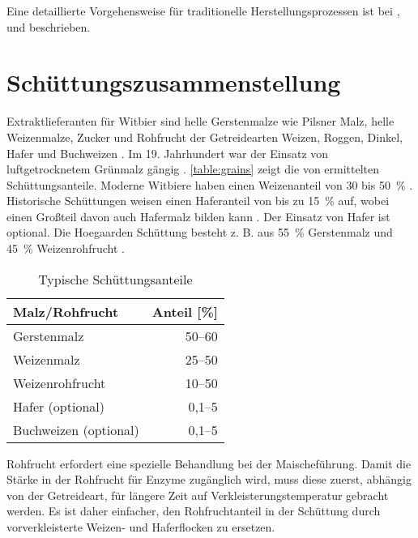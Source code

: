 \documentclass[a4paper,parskip=half]{scrartcl}
\begin{document}
Eine detaillierte Vorgehensweise für traditionelle Herstellungsprozessen
ist bei \citeauthor{Hieronymus2010}, \citeauthor{Mulder2020} und
\citeauthor{Strottner1999} beschrieben.

\section*{Schüttungszusammenstellung}

Extraktlieferanten für Witbier sind helle Gerstenmalze wie Pilsner Malz,
helle Weizenmalze, Zucker und Rohfrucht der Getreidearten Weizen, Roggen,
Dinkel, Hafer und Buchweizen \parencite[14]{Strottner1999}. Im 19.
Jahrhundert war der Einsatz von luftgetrocknetem Grünmalz gängig
\parencite[38]{Hieronymus2010}. \autoref{table:grains} zeigt die von \citeauthor{Strottner1999}
ermittelten Schüttungsanteile. Moderne Witbiere haben einen Weizenanteil
von 30 bis 50~\% \parencite[45]{Mulder2020}. Historische
Schüttungen weisen einen Haferanteil von bis zu 15~\% auf, wobei
einen Großteil davon auch Hafermalz bilden kann \parencite[45]{Hieronymus2010}.
Der Einsatz von Hafer ist optional. Die Hoegaarden Schüttung
besteht z. B. aus 55~\% Gerstenmalz und 45~\% Weizenrohfrucht \parencite[43]{Strottner1999}.

\begin{table}[H]
\centering
\begin{tabular}{lr}
\toprule
Malz/Rohfrucht      & Anteil [\%] \\
\midrule
Gerstenmalz           & 50–60 \\
Weizenmalz            & 25–50 \\
Weizenrohfrucht       & 10–50 \\
Hafer (optional)      & 0,1–5 \\
Buchweizen (optional) & 0,1–5 \\
\bottomrule
\end{tabular}
\caption{Typische Schüttungsanteile \parencite[13]{Strottner1999}}
\label{table:grains}
\end{table}

Rohfrucht erfordert eine spezielle Behandlung bei der Maischeführung. Damit
die Stärke in der Rohfrucht für Enzyme zugänglich wird, muss diese zuerst,
abhängig von der Getreideart, für längere Zeit auf Verkleisterungstemperatur
gebracht werden. Es ist daher einfacher, den Rohfruchtanteil in der Schüttung
durch vorverkleisterte Weizen- und Haferflocken zu ersetzen.

\end{document}

